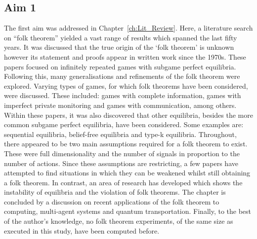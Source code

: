 \subsection{Aim 1}\label{subsec:Aim_1_concl}
The first aim was addressed in Chapter~\ref{ch:Lit_Review}. Here, a literature
search on ``folk theorem'' yielded a vast range of results which spanned the
last fifty years. It was discussed that the true origin of the `folk theorem' is
unknown however its statement and proofs appear in written work since the 1970s.
These papers focused on infinitely repeated games with subgame perfect
equilibria. Following this, many generalisations and refinements of the folk
theorem were explored. Varying types of games, for which folk theorems have been
considered, were discussed. These included: games with complete information,
games with imperfect private monitoring and games with communication, among
others. Within these papers, it was also discovered that other equilibria,
besides the more common subgame perfect equilibria, have been considered. Some
examples are: sequential equilibria, belief-free equilibria and type-k
equilibria. Throughout, there appeared to be two main assumptions required for a
folk theorem to exist. These were full dimensionality and the number of
signals in proportion to the number of actions. Since these assumptions are restricting, a few papers have attempted to find situations in which they
can be weakened whilst still obtaining a folk theorem. In contrast, an
area of research has developed which shows the instability of equilibria and
the violation of folk theorems. The chapter is concluded by a discussion on
recent applications of the folk theorem to computing, multi-agent systems and
quantum transportation. Finally, to the best of the author's knowledge, no folk
theorem experiments, of the same size as executed in this study, have been
computed before.

